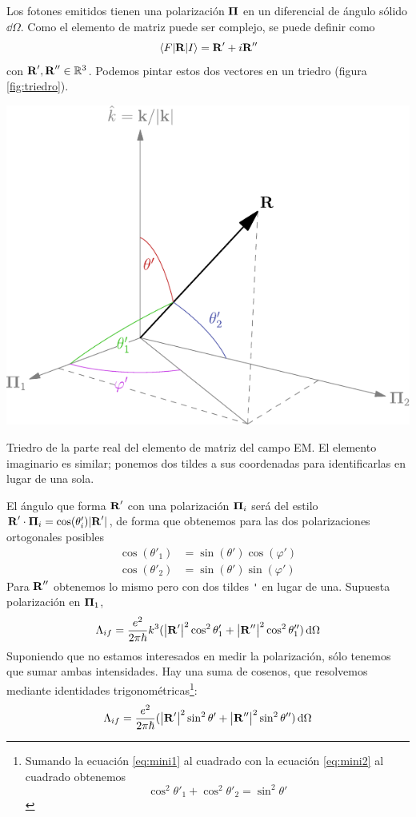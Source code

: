 Los fotones emitidos tienen una polarización $\bm{\mathrm{\Pi}}$ en un
diferencial de ángulo sólido $\dd{\Omega}$. Como el elemento de matriz
puede ser complejo, se puede definir como
\begin{equation}
  \mel{F}{\bm{\mathrm{R}}}{I} = \bm{\mathrm{R}}' + i \bm{\mathrm{R}}''
\end{equation}
con $\bm{\mathrm{R}}',\bm{\mathrm{R}}''\in \mathbb{R}^3$. Podemos pintar estos dos vectores en un triedro (figura \ref{fig:triedro}).
\begin{marginfigure}
  \centering
  \vspace{2cm}
  \includegraphics[width=\textwidth]{figures/triedro.pdf}
  \caption{Triedro de la parte real del elemento de matriz del campo
    EM. El elemento imaginario es similar; ponemos
  dos tildes a sus coordenadas para identificarlas en lugar de una sola.}
  \label{fig:triedro}
\end{marginfigure}
El ángulo que forma $\bm{\mathrm{R}}'$ con una polarización $\bm{\mathrm{\Pi}}_i$ será del
estilo $\bm{\mathrm{R}}'\cdot \bm{\mathrm{\Pi}}_i =
\cos(\theta'_i)|\bm{\mathrm{R}}'|$, de forma que obtenemos para las dos
polarizaciones ortogonales posibles
\begin{align}
  \cos(\theta'_1) &= \sin(\theta')\cos(\varphi')
  \label{eq:mini1} \\
  \cos(\theta'_2) &= \sin(\theta')\sin(\varphi')
  \label{eq:mini2}
\end{align}
Para $\bm{\mathrm{R}}''$ obtenemos lo mismo pero con dos tildes \verb~'~ en lugar de una.
Supuesta polarización en $\bm{\mathrm{\Pi}}_1$,
\begin{equation}
  \Lambda_{if} = \frac{e^2}{2\pi \hbar}k^3 (\abs{\bm{\mathrm{R}}'}^2
  \cos^2\theta'_1 + \abs{\bm{\mathrm{R}}''}^2
  \cos^2\theta''_1) \dd{\Omega}
\end{equation}
Suponiendo que no estamos interesados en medir la polarización, sólo
tenemos que sumar ambas intensidades. Hay una suma de cosenos, que
resolvemos mediante identidades trigonométricas\footnote{Sumando la
  ecuación \eqref{eq:mini1} al cuadrado con la ecuación
  \eqref{eq:mini2} al cuadrado obtenemos \[\cos^2\theta'_1+\cos^2\theta'_2=\sin^2\theta'\]}:
\begin{equation}
  \Lambda_{if} = \frac{e^2}{2\pi \hbar} (\abs{\bm{\mathrm{R}}'}^2
  \sin^2\theta' + \abs{\bm{\mathrm{R}}''}^2
  \sin^2\theta''  ) \dd{\Omega}
\end{equation}
